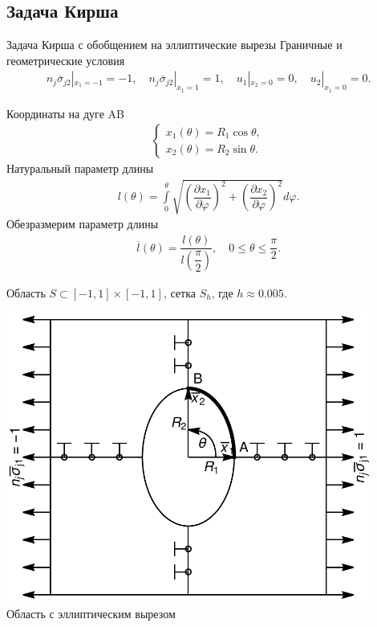 \subsection{Задача Кирша}
\begin{frame}{Задача Кирша с обобщением на эллиптические вырезы}
Граничные и геометрические условия
\begin{gather*}
	n_j \overline{\sigma}_{j2} |_{x_1 = -1} = -1,
	\quad
	n_j \overline{\sigma}_{j2} |_{x_1 =  1} =  1,
	\quad
	u_1 |_{x_2 = 0} = 0,
	\quad
	u_2 |_{x_1 = 0} = 0.
\end{gather*}
\begin{minipage}{0.49\textwidth}
	Координаты на дуге AB
	\begin{gather*}
		\begin{cases}
			x_1 (\theta) = R_1 \cos \theta, \\
			x_2 (\theta) = R_2 \sin \theta.
		\end{cases}
	\end{gather*}
	Натуральный параметр длины
\begin{gather*}
	l (\theta) = \int\limits_0^{\theta} \sqrt{
		\left( \dfrac{\partial x_1}{\partial \varphi} \right)^2 +
		\left( \dfrac{\partial x_2}{\partial \varphi} \right)^2
	} d \varphi.
\end{gather*}
Обезразмерим параметр длины
\begin{gather*}
	\overline{l} (\theta) = \dfrac{l (\theta)}{l \left( \dfrac{\pi}{2} \right)},
	\quad
	0 \leqslant \theta \leqslant \dfrac{\pi}{2}.
\end{gather*}
\end{minipage}
\begin{minipage}{0.49\textwidth}
	\justifying
	Область $S \subset [-1, 1] \times [-1, 1]$, сетка $S_h$, где $h \approx 0.005$.
	\begin{center}
		\includegraphics[width=0.9\textwidth]{pics/EllipseStress.pdf}
		Область с эллиптическим вырезом
	\end{center}
\end{minipage}
\end{frame}


